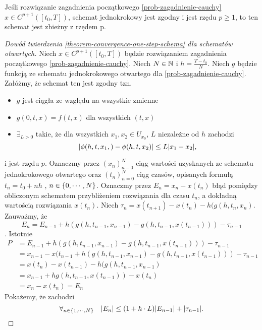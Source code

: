 \documentclass[12pt,a4paper]{report}
\begin{document}
\begin{theorem} \label{theorem-convergence-one-step-schema} 
Jeśli rozwiązanie zagadnienia początkowego \ref{prob-zagadnienie-cauchy} $x \in C^{p+1}([t_0,T])$, schemat jednokrokowy jest zgodny i jest rzędu $p\geqslant1$, to ten schemat jest zbieżny z rzędem p. 

\end{theorem}
\begin{proof}[Dowód twierdzenia \ref{theorem-convergence-one-step-schema} dla schematów otwartych]

Niech $ x \in C^{p+1}([t_0,T]) $ będzie rozwiązaniem zagadnienia początkowego  \ref{prob-zagadnienie-cauchy}. Niech $ N \in \mathbb{N} $ i $ h = \frac{T-t_0}{N} $. Niech $g$ będzie funkcją ze schematu jednokrokowego otwartego dla \ref{prob-zagadnienie-cauchy}. Załóżmy, że schemat ten jest zgodny tzn. 
\begin{itemize}
\item $g$ jest ciągła ze względu na wszystkie zmienne 
\item $ g(0,t,x) = f(t,x)$ dla wszystkich $ (t,x) $
\item $ \exists_{L>0} $ takie, że dla wszystkich $x_1 , x_2 \in U_{x_{0}} $, $L$ niezależne od $h$ zachodzi
$$
{\left| {\phi(h,t,x_1,) - \phi(h,t,x_2)} \right|} \leq L  {\left| {x_1 - x_2} \right|} ,
$$
\end{itemize}
i jest rzędu $p$. 
Oznaczmy przez $ (x_n)_{n-0}^{N} $ ciąg wartości uzyskanych ze schematu jednokrokowego otwartego oraz $(t_n)_{n=0}^{N}$ ciąg czasów, opisanych formułą $ t_n = t_0 + nh $ , $ n \in \left\lbrace {0, \cdots, N} \right\rbrace $. Oznaczmy przez $E_n = x_n - x(t_n)$ błąd pomiędzy obliczonym schematem przybliżeniem rozwiązania dla czasu $t_n$, a dokładną wartością rozwiązania $x(t_n)$. Niech $\tau_n = x(t_{n+1}) - x(t_n) - h(g(h,t_n,x_n) $. Zauważmy, że 
$$
E_n = E_{n-1} + h(g(h,t_{n-1},x_{n-1}) - g(h,t_{n-1},x(t_{n-1}))) - \tau_{n-1} 
$$. 
Istotnie
\begin{equation}
\begin{array}{rl}
P &= E_{n-1} + h(g(h,t_{n-1},x_{n-1}) - g(h,t_{n-1},x(t_{n-1}))) - \tau_{n-1} \\
 &= x_{n-1} - x(t_{n-1} + h(g(h,t_{n-1},x_{n-1}) - g(h,t_{n-1},x(t_{n-1}))) - \tau_{n-1} \\
 &= x(t_{n}) - x(t_{n-1}) - h(g(h,t_{n-1},x_{n-1}) \\
 &= x_{n-1} + hg(h,t_{n-1},x(t_{n-1})) - x(t_n) \\
 &= x_n - x(t_n) = E_n 
\end{array}
\end{equation} 
Pokażemy, że zachodzi 
\begin{equation} \label{proof1}
\forall_{n \in \left\lbrace {1,\cdots,N} \right\rbrace} \quad  {\left| {E_n} \right|} \leq (1 + h \cdot L) {\left| {E_{n-1}} \right|} + {\left| {\tau_{n-1}} \right|} .
\end{equation}
 

\end{proof}
\end{document}
